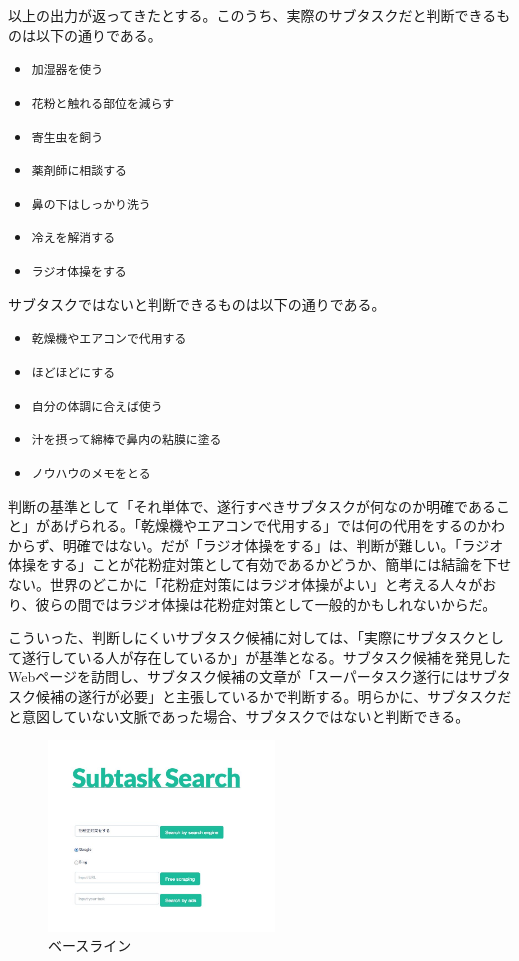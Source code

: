 \documentclass[submit,techreq]{ipsj}
\def\|{\verb|}
\begin{document}
以上の出力が返ってきたとする。このうち、実際のサブタスクだと判断できるものは以下の通りである。

\begin{itemize}
\item \|加湿器を使う|
\item \|花粉と触れる部位を減らす|
\item \|寄生虫を飼う|
\item \|薬剤師に相談する|
\item \|鼻の下はしっかり洗う|
\item \|冷えを解消する|
\item \|ラジオ体操をする|
\end{itemize}


サブタスクではないと判断できるものは以下の通りである。

\begin{itemize}
\item \|乾燥機やエアコンで代用する|
\item \|ほどほどにする|
\item \|自分の体調に合えば使う|
\item \|汁を摂って綿棒で鼻内の粘膜に塗る|
\item \|ノウハウのメモをとる|
\end{itemize}


判断の基準として「それ単体で、遂行すべきサブタスクが何なのか明確であること」があげられる。「乾燥機やエアコンで代用する」では何の代用をするのかわからず、明確ではない。だが「ラジオ体操をする」は、判断が難しい。「ラジオ体操をする」ことが花粉症対策として有効であるかどうか、簡単には結論を下せない。世界のどこかに「花粉症対策にはラジオ体操がよい」と考える人々がおり、彼らの間ではラジオ体操は花粉症対策として一般的かもしれないからだ。

こういった、判断しにくいサブタスク候補に対しては、「実際にサブタスクとして遂行している人が存在しているか」が基準となる。サブタスク候補を発見したWebページを訪問し、サブタスク候補の文章が「スーパータスク遂行にはサブタスク候補の遂行が必要」と主張しているかで判断する。明らかに、サブタスクだと意図していない文脈であった場合、サブタスクではないと判断できる。


\begin{figure}[tb]
\includegraphics[width=6cm, bb=0 0 550 719]{base_line1.jpg}
\caption{ベースライン}
\label{fig:single}
\end{figure}
\end{document}

